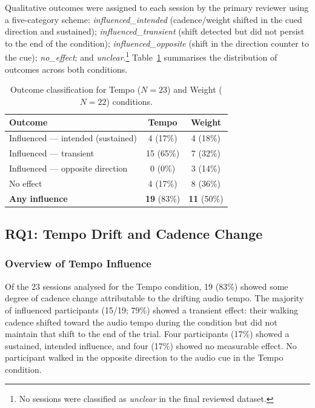 Qualitative outcomes were assigned to each session by the primary reviewer
using a five-category scheme:
\textit{influenced\_intended} (cadence/weight shifted in the cued direction and
sustained); \textit{influenced\_transient} (shift detected but did not persist
to the end of the condition); \textit{influenced\_opposite} (shift in the
direction counter to the cue); \textit{no\_effect}; and
\textit{unclear}.\footnote{No sessions were classified as \textit{unclear} in
the final reviewed dataset.}
Table~\ref{tab:outcomes} summarises the distribution of outcomes across both
conditions.

\begin{table}[ht]
\centering
\caption{Outcome classification for Tempo ($N=23$) and Weight ($N=22$)
         conditions.}
\label{tab:outcomes}
\begin{tabular}{lcc}
\hline
\textbf{Outcome} & \textbf{Tempo} & \textbf{Weight} \\
\hline
Influenced --- intended (sustained)  & 4  (17\%)  & 4  (18\%) \\
Influenced --- transient             & 15 (65\%)  & 7  (32\%) \\
Influenced --- opposite direction    & 0  (0\%)   & 3  (14\%) \\
No effect                            & 4  (17\%)  & 8  (36\%) \\
\hline
\textbf{Any influence}               & \textbf{19} (83\%) & \textbf{11} (50\%) \\
\hline
\end{tabular}
\end{table}

\subsection{RQ1: Tempo Drift and Cadence Change}
\label{sec:results:tempo}

\subsubsection{Overview of Tempo Influence}

Of the 23 sessions analysed for the Tempo condition, 19 (83\%) showed some
degree of cadence change attributable to the drifting audio tempo. The
majority of influenced participants (15/19; 79\%) showed a transient effect:
their walking cadence shifted toward the audio tempo during the condition but
did not maintain that shift to the end of the trial. Four participants (17\%)
showed a sustained, intended influence, and four (17\%) showed no measurable
effect. No participant walked in the opposite direction to the audio cue in the
Tempo condition.

